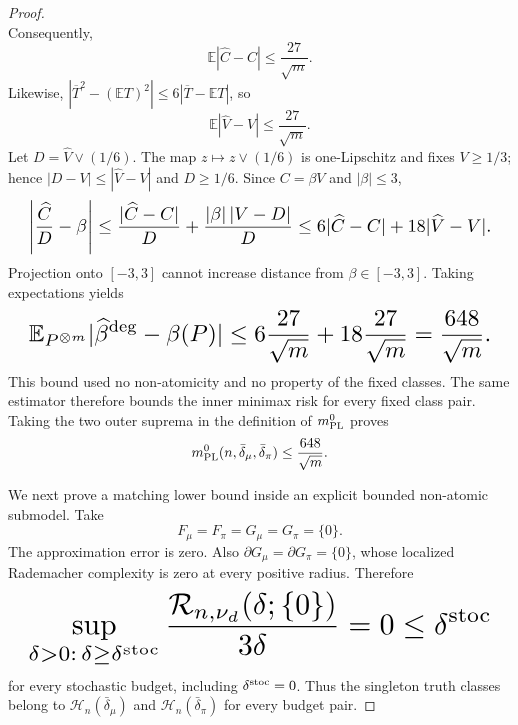 \documentclass{article}
\begin{document}
\begin{proof}
\[\]
Consequently,
\[
\mathbb E|\widehat C-C|\le\frac{27}{\sqrt m}.
\]
Likewise, \(|\overline T^2-(\mathbb ET)^2|\le6|\overline T-\mathbb ET|\), so
\[
\mathbb E|\widehat V-V|\le\frac{27}{\sqrt m}.
\]
Let \(D=\widehat V\vee(1/6)\). The map \(z\mapsto z\vee(1/6)\) is one-Lipschitz and fixes \(V\ge1/3\); hence \(|D-V|\le|\widehat V-V|\) and \(D\ge1/6\). Since \(C=\beta V\) and \(|\beta|\le3\),
\[
\makebox[\linewidth][c]{\resizebox{0.98\linewidth}{!}{\par\noindent \makebox[\linewidth][c]{\resizebox{0.98\linewidth}{!}{\(\displaystyle \displaystyle \left|\frac{\widehat C}{D}-\beta\right|\le\frac{|\widehat C-C|}{D}+\frac{|\beta|\,|V-D|}{D}\le6|\widehat C-C|+18|\widehat V-V|.\)}}\par\noindent}}
\]
Projection onto \([-3,3]\) cannot increase distance from \(\beta\in[-3,3]\). Taking expectations yields
\[
\makebox[\linewidth][c]{\resizebox{0.98\linewidth}{!}{\par\noindent \makebox[\linewidth][c]{\resizebox{0.98\linewidth}{!}{\(\displaystyle \displaystyle \mathbb E_{P^{\otimes m}}|\widehat\beta^{\rm deg}-\beta(P)|\le6\frac{27}{\sqrt m}+18\frac{27}{\sqrt m}=\frac{648}{\sqrt m}.\)}}\par\noindent}}
\]
This bound used no non-atomicity and no property of the fixed classes. The same estimator therefore bounds the inner minimax risk for every fixed class pair. Taking the two outer suprema in the definition of \(m_{\rm PL}^{0}\) proves
\[
m_{\rm PL}^{0}(n,\bar\delta_\mu,\bar\delta_\pi)\le\frac{648}{\sqrt m}.
\]

We next prove a matching lower bound inside an explicit bounded non-atomic submodel. Take
\[
F_\mu=F_\pi=G_\mu=G_\pi=\{0\}.
\]
The approximation error is zero. Also \(\partial G_\mu=\partial G_\pi=\{0\}\), whose localized Rademacher complexity is zero at every positive radius. Therefore
\[
\makebox[\linewidth][c]{\resizebox{0.98\linewidth}{!}{\par\noindent \makebox[\linewidth][c]{\resizebox{0.98\linewidth}{!}{\(\displaystyle \displaystyle \sup_{\delta>0:\,\delta\ge\delta^{\rm stoc}}\frac{\mathcal R_{n,\nu_d}(\delta;\{0\})}{3\delta}=0\le\delta^{\rm stoc}\)}}\par\noindent}}
\]
for every stochastic budget, including \(\delta^{\rm stoc}=0\). Thus the singleton truth classes belong to \(\mathcal H_n(\bar\delta_\mu)\) and \(\mathcal H_n(\bar\delta_\pi)\) for every budget pair.


\end{proof}
\end{document}
